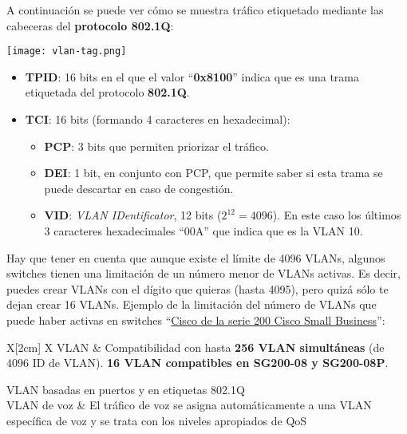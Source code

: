
A continuación se puede ver cómo se muestra tráfico etiquetado mediante las cabeceras del \textbf{protocolo 802.1Q}:

\begin{center}
    \vspace{-10pt}
    \texttt{[image: vlan-tag.png]}
    \vspace{-10pt}
\end{center}

\begin{itemize}
    \item \textbf{TPID}: 16 bits en el que el valor  “\textbf{0x8100}” indica que es una trama etiquetada del protocolo \textbf{802.1Q}.
    \item \textbf{TCI}: 16 bits (formando 4 caracteres en hexadecimal):
    \begin{itemize}
        \item \textbf{PCP}: 3 bits que permiten priorizar el tráfico.
        \item \textbf{DEI}: 1 bit, en conjunto con PCP, que permite saber si esta trama se puede descartar en caso de congestión.
        \item \textbf{VID}: \textit{VLAN IDentificator}, 12 bits ($2^{12} = 4096$). En este caso los últimos 3 caracteres hexadecimales “00A” que indica que es la VLAN 10.
    \end{itemize}
\end{itemize}

Hay que tener en cuenta que aunque existe el límite de 4096 VLANs, algunos switches tienen una limitación de un número menor de VLANs activas. Es decir, puedes crear VLANs con el dígito que quieras (hasta 4095), pero quizá sólo te dejan crear 16 VLANs. Ejemplo de la limitación del número de VLANs que puede haber activas en switches “\href{https://www.cisco.com/c/dam/en/us/products/collateral/switches/small-business-100-series-unmanaged-switches/data_sheet_c78-634369_Spanish.pdf}{Cisco de la serie 200 Cisco Small Business}”:

\begin{tblr}{X[2cm] X}
    VLAN & Compatibilidad con hasta \textbf{256 VLAN simultáneas} (de 4096 ID de VLAN). \textbf{16 VLAN compatibles en SG200-08 y SG200-08P}.

    VLAN basadas en puertos y en etiquetas 802.1Q \\

    VLAN de voz & El tráfico de voz se asigna automáticamente a una VLAN específica de voz y se trata con los niveles apropiados de QoS \\
\end{tblr}

